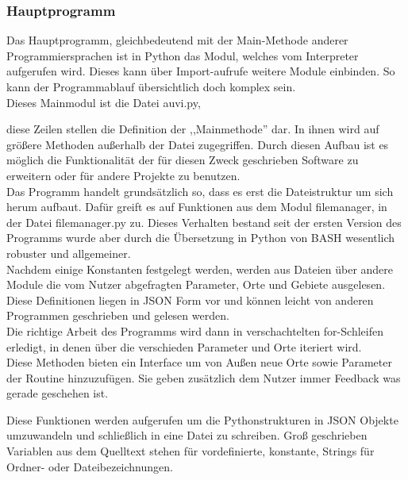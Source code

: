 \subsubsection*{Hauptprogramm}
Das Hauptprogramm, gleichbedeutend mit der Main-Methode anderer Programmiersprachen
ist in Python das Modul, welches vom Interpreter aufgerufen wird. Dieses kann über
Import-aufrufe weitere Module einbinden. So kann der Programmablauf übersichtlich doch
komplex sein.\\
Dieses Mainmodul ist die Datei auvi.py,

diese Zeilen stellen die Definition der ,,Mainmethode'' dar. In ihnen wird auf größere
Methoden außerhalb der Datei zugegriffen. Durch diesen Aufbau ist es möglich die
Funktionalität der für diesen Zweck geschrieben Software zu erweitern oder für andere
Projekte zu benutzen.\\
Das Programm handelt grundsätzlich so, dass es erst die Dateistruktur um sich herum
aufbaut. Dafür greift es auf Funktionen aus dem Modul filemanager, in der Datei
filemanager.py zu. Dieses Verhalten bestand seit der ersten Version des Programms wurde
aber durch die Übersetzung in Python von BASH wesentlich robuster und allgemeiner.\\
Nachdem einige Konstanten festgelegt werden, werden aus Dateien über andere Module
die vom Nutzer abgefragten Parameter, Orte und Gebiete ausgelesen. Diese Definitionen liegen
in JSON Form vor und können leicht von anderen Programmen geschrieben und gelesen werden.\\
Die richtige Arbeit des Programms wird dann in verschachtelten for-Schleifen erledigt, in
denen über die verschieden Parameter und Orte iteriert wird.\\

Diese Methoden bieten ein Interface um von Außen neue Orte sowie Parameter
der Routine hinzuzufügen.
Sie geben zusätzlich dem Nutzer immer Feedback was gerade geschehen ist.

Diese Funktionen werden aufgerufen um die Pythonstrukturen in JSON Objekte umzuwandeln
und schließlich in eine Datei zu schreiben. Groß geschrieben Variablen aus
dem Quelltext stehen für vordefinierte,
konstante, Strings für Ordner- oder Dateibezeichnungen.\\
